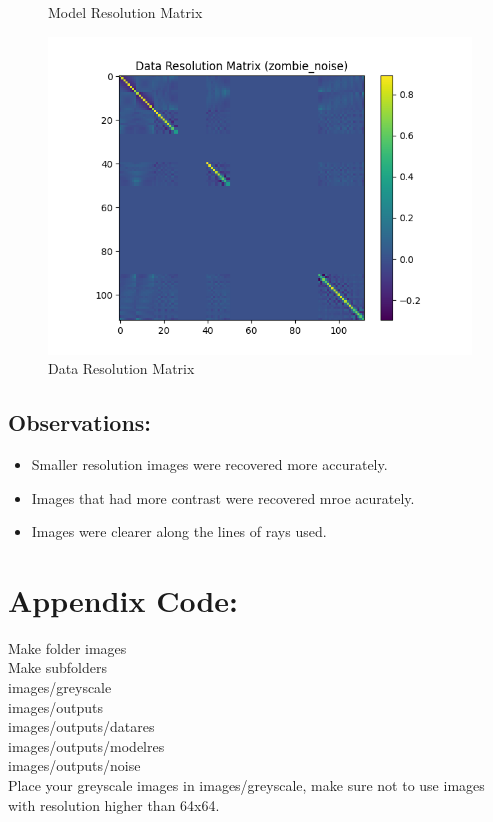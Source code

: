 \documentclass{article}
\begin{document}
\begin{itemize}
\begin{figure}[h]
        \caption{Model Resolution Matrix}
    \end{figure}
    \begin{figure}[h]
        \centering
        \includegraphics[width=1\textwidth]{images/outputs/datares/zombie_noise.png}
        \caption{Data Resolution Matrix}
    \end{figure}
    \clearpage

\end{itemize}

\subsection{Observations:}
\begin{itemize}
    \item Smaller resolution images were recovered more accurately.
    \item Images that had more contrast were recovered mroe acurately.
    \item Images were clearer along the lines of rays used.
\end{itemize}

\section{Appendix Code:}

Make folder images\\
Make subfolders\\
images/greyscale\\
images/outputs\\ 
images/outputs/datares\\
images/outputs/modelres\\
images/outputs/noise\\
Place your greyscale images in images/greyscale, make sure not to use images with resolution higher than 64x64.
\end{document}
